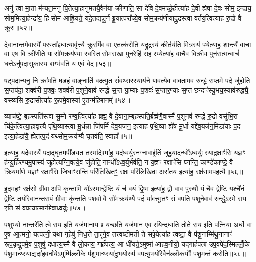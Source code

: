 अनु॑ त्वा मा॒ता म॑न्यता॒मनु॑ पि॒तेत्या॒हानु॑मतयै॒वैन॑या क्रीणाति॒ सा दे॑वि दे॒वमच्छे॒हीत्या॑ह दे॒वी ह्ये॑षा दे॒वः सोम॒ इन्द्रा॑य॒ सोम॒मित्या॒हेन्द्रा॑य॒ हि सोम॑ आह्रि॒यते॒ यदे॒तद्यजु॒र्न ब्रू॒यात्परा᳚च्ये॒व सो॑म॒क्रय॑णीयाद्रु॒द्रस्त्वा व॑र्तय॒त्वित्या॑ह रु॒द्रो वै क्रू॒रः॥५२॥

दे॒वाना॒न्तमे॒वास्यै॑ प॒रस्ता᳚द्दधा॒त्यावृ॑त्त्यै क्रू॒रमि॑व॒ वा ए॒तत्क॑रोति॒ यद्रु॒द्रस्य॑ की॒र्तय॑ति मि॒त्रस्य॑ प॒थेत्या॑ह॒ शान्त्यै॑ वा॒चा वा ए॒ष वि क्री॑णीते॒ यः सो॑म॒क्रय॑ण्या स्व॒स्ति सोम॑सखा॒ पुन॒रेहि॑ स॒ह र॒य्येत्या॑ह वा॒चैव वि॒क्रीय॒ पुन॑रा॒त्मन्वाचं॑ ध॒त्ते\-ऽनु॑पदासुकास्य॒ वाग्भ॑वति॒ य ए॒वं वेद॑॥५३॥

{\anuvakamend[{सत॑नुं॒ विष्ण॑व॒ इत्या॑ह स॒मारो॑हति॒ ध्याय॑ति॒ तद्वा॒चा यज॑मानः स्यात्करोति क्रू॒रो वेद॑॥७॥}]}

षट्प॒दान्यनु॒ नि क्रा॑मति षड॒हं वाङ्नाति॑ वदत्यु॒त सं॑वथ्स॒रस्याय॑ने॒ याव॑त्ये॒व वाक्तामव॑ रुन्द्धे सप्त॒मे प॒दे जु॑होति स॒प्तप॑दा॒ शक्व॑री प॒शवः॒ शक्व॑री प॒शूने॒वाव॑ रुन्द्धे स॒प्त ग्रा॒म्याः प॒शवः॑ स॒प्तार॒ण्याः स॒प्त छन्दाꣳ॑स्यु॒भय॒स्याव॑रुद्ध्यै॒ वस्व्य॑सि रु॒द्रासीत्या॑ह रू॒पमे॒वास्या॑ ए॒तन्म॑हि॒मानम्᳚॥५४॥

व्याच॑ष्टे॒ बृह॒स्पति॑स्त्वा सु॒म्ने र॑ण्व॒त्वित्या॑ह॒ ब्रह्म॒ वै दे॒वाना॒म्बृह॒स्पति॒र्ब्रह्म॑णै॒वास्मै॑ प॒शूनव॑ रुन्द्धे रु॒द्रो वसु॑भि॒रा चि॑के॒त्वित्या॒हावृ॑त्त्यै पृथि॒व्यास्त्वा॑ मू॒र्धन्ना जि॑घर्मि देव॒यज॑न॒ इत्या॑ह पृथि॒व्या ह्ये॑ष मू॒र्धा यद्दे॑व॒यज॑न॒मिडा॑याः प॒द इत्या॒हेडा॑यै॒ ह्ये॑तत्प॒दं यथ्सो॑म॒क्रय॑ण्यै घृ॒तव॑ति॒ स्वाहा᳚॥५॥

इत्या॑ह॒ यदे॒वास्यै॑ प॒दाद्घृ॒तमपी᳚ड्यत॒ तस्मा॑दे॒वमा॑ह॒ यद॑ध्व॒र्युर॑न॒ग्नावाहु॑तिं जुहु॒याद॒न्धो᳚\-ऽध्व॒र्युः स्या॒द्रक्षाꣳ॑सि य॒ज्ञꣳ ह॑न्यु॒र्\mbox{}हिर॑ण्यमु॒पास्य॑ जुहोत्यग्नि॒वत्ये॒व जु॑होति॒ नान्धो᳚\-ऽध्व॒र्युर्भव॑ति॒ न य॒ज्ञꣳ रक्षाꣳ॑सि घ्नन्ति॒ काण्डे॑काण्डे॒ वै क्रि॒यमा॑णे य॒ज्ञꣳ रक्षाꣳ॑सि जिघाꣳसन्ति॒ परि॑लिखित॒ꣳ॒ रक्षः॒ परि॑लिखिता॒ अरा॑तय॒ इत्या॑ह॒ रक्ष॑सा॒मप॑हत्यै॥५६॥

इ॒दम॒हꣳ रक्ष॑सो ग्री॒वा अपि॑ कृन्तामि॒ यो᳚\-ऽस्मान्द्वेष्टि॒ यं च॑ व॒यं द्वि॒ष्म इत्या॑ह॒ द्वौ वाव पुरु॑षौ॒ यं चै॒व द्वेष्टि॒ यश्चै॑नं॒ द्वेष्टि॒ तयो॑रे॒वान॑न्तरायं ग्री॒वाः कृ॑न्तति प॒शवो॒ वै सो॑म॒क्रय॑ण्यै प॒दं या॑वत्त्मू॒तꣳ सं व॑पति प॒शूने॒वाव॑ रुन्द्धे॒\-ऽस्मे राय॒ इति॒ सं व॑पत्या॒त्मान॑मे॒वाध्व॒र्युः॥५७॥

प॒शुभ्यो॒ नान्तरे॑ति॒ त्वे राय॒ इति॒ यज॑मानाय॒ प्र य॑च्छति॒ यज॑मान ए॒व र॒यिन्द॑धाति॒ तोते॒ राय॒ इति॒ पत्नि॑या अ॒र्धो वा ए॒ष आ॒त्मनो॒ यत्पत्नी॒ यथा॑ गृ॒हेषु॑ निध॒त्ते ता॒दृगे॒व तत्त्वष्टी॑मती ते सपे॒येत्या॑ह॒ त्वष्टा॒ वै प॑शू॒नाम्मि॑थु॒नानाꣳ॑ रूप॒कृद्रू॒पमे॒व प॒शुषु॑ दधात्य॒स्मै वै लो॒काय॒ गार्\mbox{}ह॑पत्य॒ आ धी॑यते॒\-ऽमुष्मा॑ आहव॒नीयो॒ यद्गार्\mbox{}ह॑पत्य उप॒वपे॑द॒स्मिल्लोँ॒के प॑शु॒मान्थ्स्या॒द्यदा॑हव॒नीये॒\-ऽमुष्मि॑ल्लोँ॒के प॑शु॒मान्थ्स्या॑दु॒भयो॒रुप॑ वपत्यु॒भयो॑रे॒वैन॑ल्लोँ॒कयोः᳚ पशु॒मन्तं॑ करोति॥५८॥

